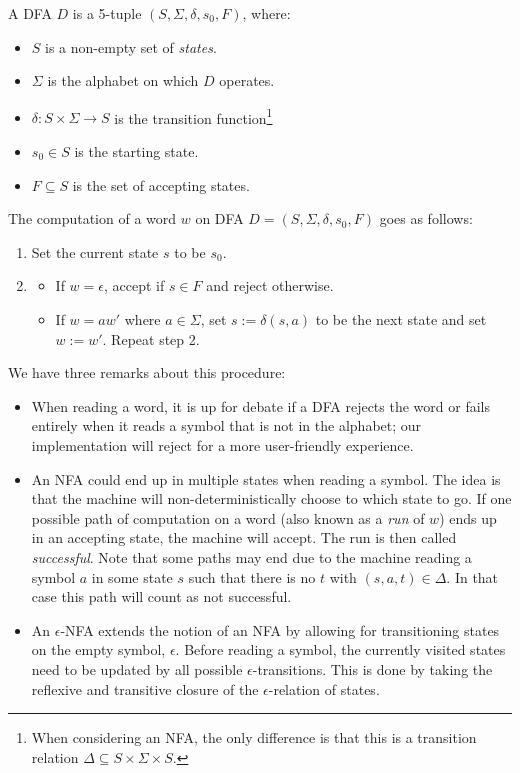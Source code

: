 \begin{definition}
	A DFA $D$ is a 5-tuple $(S, \Sigma, \delta, s_0, F)$, where:
	\begin{itemize}
		\item $S$ is a non-empty set of \emph{states}.
		\item $\Sigma$ is the alphabet on which $D$ operates.
		\item $\delta:S\times \Sigma\to S$ is the transition function\footnote{When considering an NFA, the only difference is that this is a transition relation $\Delta\subseteq S\times\Sigma\times S$.}
		\item $s_0\in S$ is the starting state.
		\item $F\subseteq S$ is the set of accepting states.
	\end{itemize}	
\end{definition}

The computation of a word $w$ on DFA $D=(S,\Sigma, \delta,s_0,F)$ goes as follows:
\begin{enumerate}
	\item Set the current state $s$ to be $s_0$. 
	\item
	\begin{itemize}
		\item If $w=\epsilon$, accept if $s\in F$ and reject otherwise.
		\item If $w = aw'$ where $a\in \Sigma$, set $s:=\delta(s,a)$ to be the next state and set $w := w'$. Repeat step 2.  
	\end{itemize}
\end{enumerate}
We have three remarks about this procedure:
\begin{itemize}
\item When reading a word, it is up for debate if a DFA rejects the word or fails entirely when it reads a symbol that is not in the alphabet; our implementation will reject for a more user-friendly experience. 
\item An NFA could end up in multiple states when reading a symbol. The idea is that the machine will non-deterministically choose to which state to go. If one possible path of computation on a word (also known as a \emph{run} of $w$) ends up in an accepting state, the machine will accept. The run is then called \emph{successful}. Note that some paths may end due to the machine reading a symbol $a$ in some state $s$ such that there is no $t$ with $(s,a,t)\in \Delta$. In that case this path will count as not successful.
\item An $\epsilon$-NFA extends the notion of an NFA by allowing for transitioning states on the empty symbol, $\epsilon$. Before reading a symbol, the currently visited states need to be updated by all possible $\epsilon$-transitions. This is done by taking the reflexive and transitive closure of the $\epsilon$-relation of states. 
\end{itemize}

